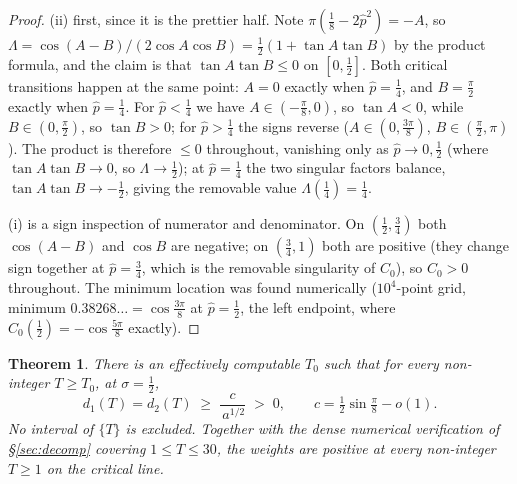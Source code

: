 \documentclass[11pt]{article}
\newtheorem{theorem}{Theorem}[section]
\theoremstyle{definition}
\begin{document}
\begin{proof}
(ii) first, since it is the prettier half. Note
$\pi(\tfrac18-2\hat p^{2})=-A$, so
$\Lambda=\cos(A-B)/(2\cos A\cos B)=\tfrac12(1+\tan A\tan B)$ by the product
formula, and the claim is that $\tan A\tan B\leq0$ on $[0,\tfrac12]$. Both
critical transitions happen at the same point: $A=0$ exactly when
$\hat p=\tfrac14$, and $B=\tfrac\pi2$ exactly when $\hat p=\tfrac14$. For
$\hat p<\tfrac14$ we have $A\in(-\tfrac\pi8,0)$, so $\tan A<0$, while
$B\in(0,\tfrac\pi2)$, so $\tan B>0$; for $\hat p>\tfrac14$ the signs
reverse ($A\in(0,\tfrac{3\pi}8)$, $B\in(\tfrac\pi2,\pi)$). The product is
therefore $\leq0$ throughout, vanishing only as $\hat p\to0,\tfrac12$
(where $\tan A\tan B\to0$, so $\Lambda\to\tfrac12$); at $\hat p=\tfrac14$
the two singular factors balance, $\tan A\tan B\to-\tfrac12$, giving the
removable value $\Lambda(\tfrac14)=\tfrac14$.

(i) is a sign inspection of numerator and denominator. On
$(\tfrac12,\tfrac34)$ both $\cos(A-B)$ and $\cos B$ are negative; on
$(\tfrac34,1)$ both are positive (they change sign together at
$\hat p=\tfrac34$, which is the removable singularity of $C_0$), so
$C_0>0$ throughout. The minimum location was found numerically
($10^{4}$-point grid, minimum $0.38268\ldots=\cos\tfrac{3\pi}8$ at
$\hat p=\tfrac12$, the left endpoint, where
$C_0(\tfrac12)=-\cos\tfrac{5\pi}8$ exactly).
\end{proof}

\begin{theorem}\label{thm:d1-positive-line}
There is an effectively computable $T_0$ such that for every non-integer
$T\geq T_0$, at $\sigma=\tfrac12$,
\[
d_1(T)=d_2(T)\;\geq\;\frac{c}{\,a^{1/2}}\;>\;0,
\qquad c=\tfrac12\sin\tfrac\pi8-o(1).
\]
No interval of $\{T\}$ is excluded. Together with the dense numerical
verification of \S\ref{sec:decomp} covering $1\leq T\leq30$, the weights are
positive at every non-integer $T\geq1$ on the critical line.
\end{theorem}
\end{document}
